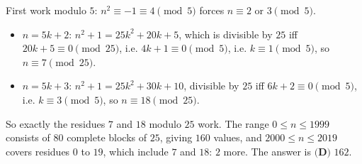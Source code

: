 First work modulo $5$: $n^2\equiv-1\equiv4\pmod5$ forces $n\equiv2$ or $3\pmod5$.
\begin{itemize}
\item $n=5k+2$: $n^2+1=25k^2+20k+5$, which is divisible by $25$ iff $20k+5\equiv0\pmod{25}$, i.e. $4k+1\equiv0\pmod5$, i.e. $k\equiv1\pmod5$, so $n\equiv7\pmod{25}$.
\item $n=5k+3$: $n^2+1=25k^2+30k+10$, divisible by $25$ iff $6k+2\equiv0\pmod5$, i.e. $k\equiv3\pmod5$, so $n\equiv18\pmod{25}$.
\end{itemize}
So exactly the residues $7$ and $18$ modulo $25$ work. The range $0\le n\le1999$ consists of $80$ complete blocks of $25$, giving $160$ values, and $2000\le n\le2019$ covers residues $0$ to $19$, which include $7$ and $18$: $2$ more. The answer is $\boxed{\textbf{(D) }162}$.
